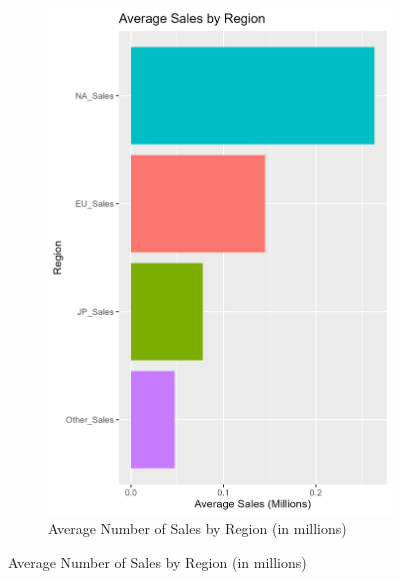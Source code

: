 \documentclass[12pt,english]{article}
\begin{document}
\begin{figure}[ht]
\begin{subfigure}{0.49\linewidth}
    \includegraphics[width=\linewidth]{Figures/avg_sales_region.png}
    \caption{Average Number of Sales by Region (in millions)}
    \label{fig:fig2}
\end{subfigure}
\label{fig:combined1}
\end{figure}
\end{document}

